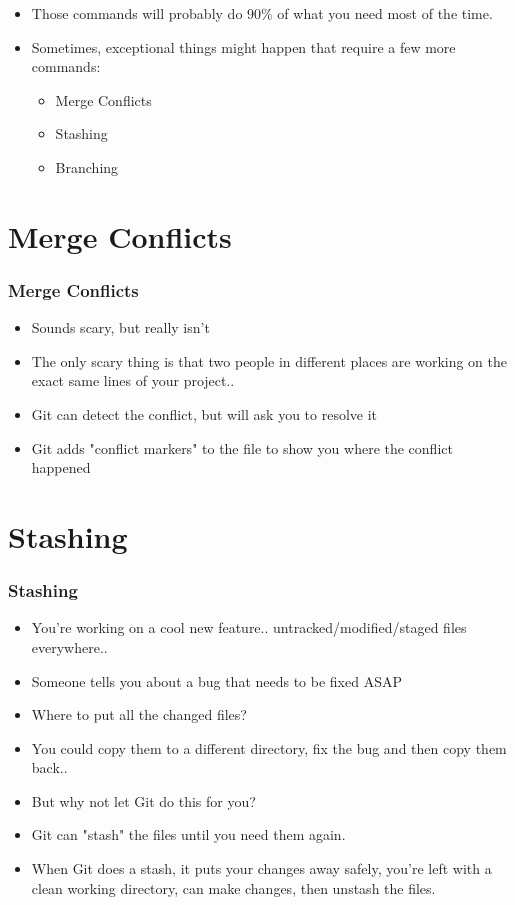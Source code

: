 \documentclass{beamer}
\begin{document}
\begin{frame}
\begin{itemize}
\pause
\item Those commands will probably do 90\% of what you need most of the time.
\pause
\item Sometimes, exceptional things might happen that require a few more commands:
\pause
	\begin{itemize}
	\item Merge Conflicts
	\pause
	\item Stashing
	\pause
	\item Branching
	\end{itemize}
\end{itemize}
\end{frame}


\section{Merge Conflicts}
\begin{frame}
\frametitle{Merge Conflicts}
\begin{itemize}
\pause
\item Sounds scary, but really isn't
\pause
\item The only scary thing is that two people in different places are working
on the exact same lines of your project..
\pause
\item Git can detect the conflict, but will ask you to resolve it
\pause
\item Git adds "conflict markers" to the file to show you where the conflict
happened
\end{itemize}
\end{frame}


\section{Stashing}
\begin{frame}
\frametitle{Stashing}
\begin{itemize}
\pause
\item You're working on a cool new feature.. untracked/modified/staged files
everywhere..
\pause
\item Someone tells you about a bug that needs to be fixed ASAP
\pause
\item Where to put all the changed files?
\pause
\item You could copy them to a different directory, fix the bug and then copy
them back..
\pause
\item But why not let Git do this for you?
\pause
\item Git can "stash" the files until you need them again.
\pause
\item When Git does a stash, it puts your changes away safely, you're left with
a clean working directory, can make changes, then unstash the files.
\end{itemize}
\end{frame}
\end{document}
